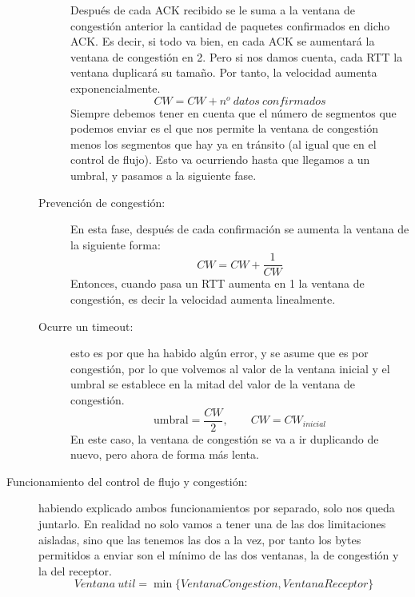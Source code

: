 \begin{description}
\begin{description}
        Después de cada ACK recibido se le suma a la ventana de congestión anterior la cantidad de paquetes confirmados en dicho ACK. Es decir, si todo va bien, en cada ACK se aumentará la ventana de congestión en 2. Pero si nos damos cuenta, cada \acrshort{RTT} la ventana duplicará su tamaño. Por tanto, la velocidad aumenta exponencialmente.
        \begin{equation*}
            CW = CW + n^o \ datos \ confirmados
        \end{equation*}
        Siempre debemos tener en cuenta que el número de segmentos que podemos enviar es el que nos permite la ventana de congestión menos los segmentos que hay ya en tránsito (al igual que en el control de flujo). 
        Esto va ocurriendo hasta que llegamos a un umbral, y pasamos a la siguiente fase.
    \item [Prevención de congestión:] En esta fase, después de cada confirmación se aumenta la ventana de la siguiente forma:
        \begin{equation*}
            CW = CW + \frac{1}{CW}
        \end{equation*}
        Entonces, cuando pasa un \acrshort{RTT} aumenta en 1 la ventana de congestión, es decir la velocidad aumenta linealmente. 
    \item [Ocurre un timeout:] esto es por que ha habido algún error, y se asume que es por congestión, por lo que volvemos al valor de la ventana inicial y el umbral se establece en la mitad del valor de la ventana de congestión. 
        \begin{equation*}
            \text{umbral} = \frac{CW}{2}, \qquad CW = CW_{inicial}
        \end{equation*}
        En este caso, la ventana de congestión se va a ir duplicando de nuevo, pero ahora de forma más lenta.
\end{description}

    \item [Funcionamiento del control de flujo y congestión:] habiendo explicado ambos funcionamientos por separado, solo nos queda juntarlo. En realidad no solo vamos a tener una de las dos limitaciones aisladas, sino que las tenemos las dos a la vez, por tanto los bytes permitidos a enviar son el mínimo de las dos ventanas, la de congestión y la del receptor.
        \begin{equation*}
            Ventana \ util = \min\{VentanaCongestion, VentanaReceptor\}
        \end{equation*}
\end{description}

